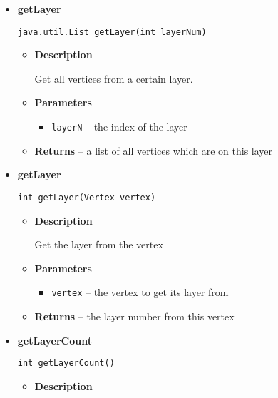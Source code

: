 {{{{{{{{{{{{\begin{itemize}
{\begin{itemize}
{Returns the height, i.e. the number of layers.
}
\item{{\bf  Returns} -- 
the height 
}%
\end{itemize}
}%
\item{ 
{\bf  getLayer}\\
\begin{lstlisting}[frame=none]
java.util.List getLayer(int layerNum)\end{lstlisting} %
\begin{itemize}
\item{
{\bf  Description}

Get all vertices from a certain layer.
}
\item{
{\bf  Parameters}
  \begin{itemize}
   \item{
\texttt{layerN} -- the index of the layer}
  \end{itemize}
}%
\item{{\bf  Returns} -- 
a list of all vertices which are on this layer 
}%
\end{itemize}
}%
\item{ 
{\bf  getLayer}\\
\begin{lstlisting}[frame=none]
int getLayer(Vertex vertex)\end{lstlisting} %
\begin{itemize}
\item{
{\bf  Description}

Get the layer from the vertex
}
\item{
{\bf  Parameters}
  \begin{itemize}
   \item{
\texttt{vertex} -- the vertex to get its layer from}
  \end{itemize}
}%
\item{{\bf  Returns} -- 
the layer number from this vertex 
}%
\end{itemize}
}%
\item{ 
{\bf  getLayerCount}\\
\begin{lstlisting}[frame=none]
int getLayerCount()\end{lstlisting} %
\begin{itemize}
\item{
{\bf  Description}

}
\end{itemize}}
\end{itemize}}}}}}}}}}}}}
